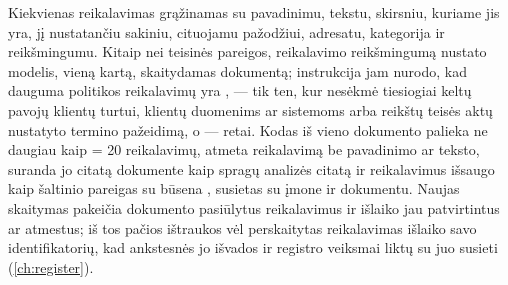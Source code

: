 Kiekvienas reikalavimas grąžinamas su pavadinimu, tekstu, skirsniu, kuriame jis yra, jį
nustatančiu sakiniu, cituojamu pažodžiui, adresatu, kategorija ir reikšmingumu. Kitaip nei
teisinės pareigos, reikalavimo reikšmingumą nustato modelis, vieną kartą, skaitydamas
dokumentą; instrukcija jam nurodo, kad dauguma politikos reikalavimų yra ,
 --- tik ten, kur nesėkmė tiesiogiai keltų pavojų klientų turtui, klientų duomenims
ar sistemoms arba reikštų teisės aktų nustatyto termino pažeidimą, o  --- retai.
Kodas iš vieno dokumento palieka ne daugiau kaip  = 20
reikalavimų, atmeta reikalavimą be pavadinimo ar teksto, suranda jo citatą dokumente kaip
spragų analizės citatą ir reikalavimus išsaugo kaip šaltinio  pareigas su būsena
, susietas su įmone ir dokumentu. Naujas skaitymas pakeičia dokumento pasiūlytus
reikalavimus ir išlaiko jau patvirtintus ar atmestus; iš tos pačios ištraukos vėl perskaitytas
reikalavimas išlaiko savo identifikatorių, kad ankstesnės jo išvados ir registro veiksmai liktų
su juo susieti (\cref{ch:register}).

